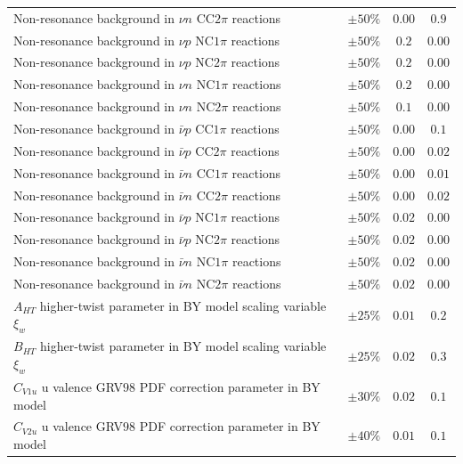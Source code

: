 \begin{longtable}{p{3.25in} c c c}
  Non-resonance background in $\nu n$ CC$2\pi$ reactions & $\pm50\%$ & $0.00$ & $0.9$ \\
  Non-resonance background in $\nu p$ NC$1\pi$ reactions & $\pm50\%$ & $0.2$ & $0.00$ \\
  Non-resonance background in $\nu p$ NC$2\pi$ reactions & $\pm50\%$ & $0.2$ & $0.00$ \\
  Non-resonance background in $\nu n$ NC$1\pi$ reactions & $\pm50\%$ & $0.2$ & $0.00$ \\
  Non-resonance background in $\nu n$ NC$2\pi$ reactions & $\pm50\%$ & $0.1$ & $0.00$ \\
  Non-resonance background in $\bar{\nu} p$ CC$1\pi$ reactions & $\pm50\%$ & $0.00$ & $0.1$ \\
  Non-resonance background in $\bar{\nu} p$ CC$2\pi$ reactions & $\pm50\%$ & $0.00$ & $0.02$ \\
  Non-resonance background in $\bar{\nu} n$ CC$1\pi$ reactions & $\pm50\%$ & $0.00$ & $0.01$ \\
  Non-resonance background in $\bar{\nu} n$ CC$2\pi$ reactions & $\pm50\%$ & $0.00$ & $0.02$ \\
  Non-resonance background in $\bar{\nu} p$ NC$1\pi$ reactions & $\pm50\%$ & $0.02$ & $0.00$ \\
  Non-resonance background in $\bar{\nu} p$ NC$2\pi$ reactions & $\pm50\%$ & $0.02$ & $0.00$ \\
  Non-resonance background in $\bar{\nu} n$ NC$1\pi$ reactions & $\pm50\%$ & $0.02$ & $0.00$ \\
  Non-resonance background in $\bar{\nu} n$ NC$2\pi$ reactions & $\pm50\%$ & $0.02$ & $0.00$ \\
  $A_{HT}$ higher-twist parameter in BY model scaling \newline variable $\xi_w$ & $\pm25\%$ & $0.01$ & $0.2$ \\
  $B_{HT}$ higher-twist parameter in BY model scaling \newline variable $\xi_w$ & $\pm25\%$ & $0.02$ & $0.3$ \\
  $C_{V1u}$ u valence GRV$98$ PDF correction parameter \newline in BY model & $\pm30\%$ & $0.02$ & $0.1$ \\
  $C_{V2u}$ u valence GRV$98$ PDF correction parameter \newline in BY model & $\pm40\%$ & $0.01$ & $0.1$ \\

\end{longtable}
